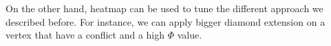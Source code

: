 On the other hand, heatmap can be used to tune the different approach we described before. For instance, we can apply bigger diamond extension on a vertex that have a conflict and a high \(\Phi\) value.  




















